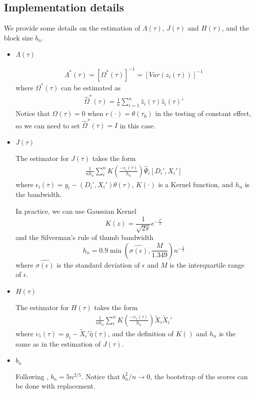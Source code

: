 \subsection{Implementation details}

We provide some details on the estimation of $\Lambda(\tau)$, $J(\tau)$ and
$H(\tau)$, and the block size $b_n$.

\begin{itemize}
  \item {\bf $\Lambda(\tau)$}

\begin{align*}
  \Lambda^*(\tau) = \left[ \Omega^*(\tau) \right]^{-1} = 
	\left[ Var(z_i(\tau)) \right]^{-1} 
\end{align*}
where $\Omega^*(\tau)$ can be estimated as
\begin{align*}
  \widehat{\Omega}^*(\tau) = \frac{1}{n}\sum_{i=1}^{n} \hat{z}_i(\tau) 
\hat{z}_i(\tau)'
\end{align*}
Notice that $\Omega(\tau) = 0$ when $r(\cdot) = \theta(\tau_0)$ in the testing
of constant effect, so we can need to set $\widehat{\Omega}^*(\tau) = I$ in this
case.

\item {\bf $J(\tau)$}

The estimator for $J(\tau)$ takes the form
\begin{align*}
	\frac{1}{n h_n}\sum_{i}^n K\left(\frac{- \epsilon_i(\tau)}{h_n}\right)
	\widehat{\Psi}_i[D_i', X_i']
\end{align*}
where  $\epsilon_i(\tau) = y_i - (D_i', X_i')\theta(\tau)$, 
$K(\cdot)$ is a Kernel function, and $h_n$ is the bandwidth.

In practice, we can use Gaussian Kernel
$$
K(z) = \frac{1}{\sqrt{2\pi}}e^{-\frac{z^2}{2}}
$$
and the Silverman's rule of thumb bandwidth
$$
h_n = 0.9 \min\left(\widehat{\sigma(\epsilon)}, \frac{M}{1.349}\right)
n^{-\frac{1}{5}}
$$
where $\widehat{\sigma(\epsilon)}$ is the standard deviation of $\epsilon$ and
$M$ is the interquartile range of $\epsilon$.

\item {\bf $H(\tau)$}

The estimator for $H(\tau)$ takes the form
\begin{align*}
	\frac{1}{n h_n}\sum_{i}^n K\left(\frac{- \upsilon_i(\tau)}{h_n}\right)
	\tilde{X}_i\tilde{X}_i'
\end{align*}
where  $\upsilon_i(\tau) = y_i - \tilde{X}_i'\hat{\eta}(\tau)$, and the
definition of $K()$ and $h_n$ is the same as in the estimation of $J(\tau)$.

\item $b_n$

  Following \cite{Chernozhukov2006}, $b_n = 5 n^{2/5}$. Notice that $b_n^2/n
  \rightarrow 0$, the bootstrap of the scores can be done with replacement.
\end{itemize}


